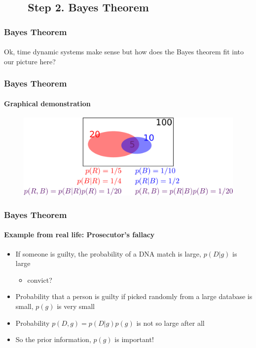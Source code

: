 \documentclass{beamer}
\begin{document}
\subsection{\ \ \ \ Step 2. Bayes Theorem}
\begin{frame}
\frametitle{Bayes Theorem}
\framesubtitle{}
\mypagenum
Ok, time dynamic systems make sense but how does the Bayes theorem fit into our picture here?
\end{frame}



\begin{frame}
\frametitle{Bayes Theorem}
\framesubtitle{Graphical demonstration}
\mypagenum
\begin{changemargin}{-1.3in}{0in}
\begin{figure}
\includegraphics[width=1.35\textwidth]{figs/PRML_Bayes.pdf}
\end{figure}
\end{changemargin}
\end{frame}



\begin{frame}
\frametitle{Bayes Theorem}
\framesubtitle{Example from real life: Prosecutor's fallacy}
\mypagenum
\begin{itemize}
\item If someone is guilty, the probability of a DNA match is large, $p(D|g)$ is large
\begin{itemize}
\item convict?
\end{itemize}
\item Probability that a person is guilty if picked randomly from a large database is small, $p(g)$ is very small
\item Probability $p(D,g)=p(D|g)p(g)$ is not so large after all
\item So the prior information, $p(g)$ is important!
\end{itemize}
\end{frame}
\end{document}
